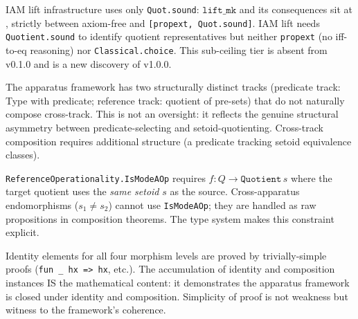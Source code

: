 \begin{finding}
\label{finding:S2B}
\leanok
{}
IAM lift infrastructure uses only \texttt{Quot.sound}:
$\texttt{lift\_mk}$ and its consequences sit at
, strictly between axiom-free and
\texttt{[propext, Quot.sound]}.  IAM lift needs \texttt{Quotient.sound}
to identify quotient representatives but neither \texttt{propext}
(no iff-to-eq reasoning) nor \texttt{Classical.choice}.
This sub-ceiling tier is absent from v0.1.0 and is a new discovery of v1.0.0.
\end{finding}

\begin{finding}
\label{finding:S3A}
\leanok
{}
The apparatus framework has two structurally distinct tracks
(predicate track: Type with predicate; reference track: quotient of pre-sets)
that do not naturally compose cross-track.  This is not an oversight: it
reflects the genuine structural asymmetry between predicate-selecting and
setoid-quotienting.  Cross-track composition requires additional structure
(a predicate tracking setoid equivalence classes).
\end{finding}

\begin{finding}
\label{finding:S3B}
\leanok
{}
\texttt{ReferenceOperationality.IsModeAOp} requires $f : Q \to
\texttt{Quotient}\,s$ where the target quotient uses the \emph{same setoid}
$s$ as the source.  Cross-apparatus endomorphisms ($s_1 \ne s_2$) cannot
use \texttt{IsModeAOp}; they are handled as raw propositions in composition
theorems.  The type system makes this constraint explicit.
\end{finding}

\begin{finding}
\label{finding:S3C}
\leanok
{}
Identity elements for all four morphism levels are proved by
trivially-simple proofs (\texttt{fun \_ hx => hx}, etc.).  The accumulation
of identity and composition instances IS the mathematical content: it
demonstrates the apparatus framework is closed under identity and
composition.  Simplicity of proof is not weakness but witness to the
framework's coherence.
\end{finding}

